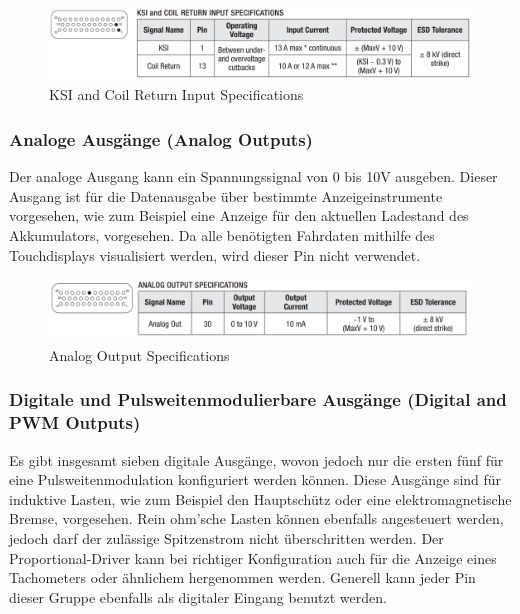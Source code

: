 \begin{figure}[H]
	\begin{center}
		\includegraphics[width=\textwidth]{figures/antrieb/KSI_CoilReturn_Input_Specifications.png}
		\caption{KSI and Coil Return Input Specifications}
	\end{center}
\end{figure}



\subsubsection{Analoge Ausgänge (Analog Outputs)}
Der analoge Ausgang kann ein Spannungssignal von 0 bis 10V ausgeben. Dieser Ausgang ist für die Datenausgabe über bestimmte Anzeigeinstrumente vorgesehen, wie zum Beispiel eine Anzeige für den aktuellen Ladestand des Akkumulators, vorgesehen. Da alle benötigten Fahrdaten mithilfe des Touchdisplays visualisiert werden, wird dieser Pin nicht verwendet.

\begin{figure}[H]
	\begin{center}
		\includegraphics[width=\textwidth]{figures/antrieb/Analog_Output_Specifications.png}
		\caption{Analog Output Specifications}
	\end{center}
\end{figure}


\newpage



\subsubsection{Digitale und Pulsweitenmodulierbare Ausgänge (Digital and PWM Outputs)}
Es gibt insgesamt sieben digitale Ausgänge, wovon jedoch nur die ersten fünf für eine Pulsweitenmodulation konfiguriert werden können. Diese Ausgänge sind für induktive Lasten, wie zum Beispiel den Hauptschütz oder eine elektromagnetische Bremse, vorgesehen. Rein ohm'sche Lasten können ebenfalls angesteuert werden, jedoch darf der zulässige Spitzenstrom nicht überschritten werden. Der Proportional-Driver kann bei richtiger Konfiguration auch für die Anzeige eines Tachometers oder ähnlichem hergenommen werden. Generell kann jeder Pin dieser Gruppe ebenfalls als digitaler Eingang benutzt werden.

